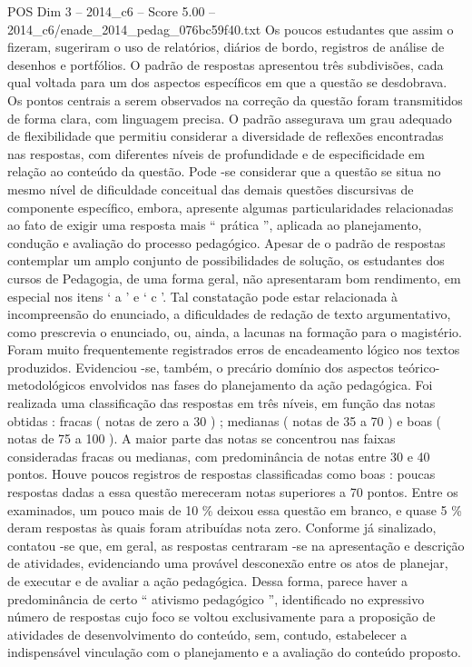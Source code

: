 \begin{textsample}{POS Dim 3 – 2014\_c6 – Score 5.00 – 2014\_c6/enade\_2014\_pedag\_076bc59f40.txt}
Os poucos estudantes que assim o fizeram, sugeriram o uso de relatórios, diários de bordo, registros de análise de desenhos e portfólios.
O padrão de respostas apresentou três subdivisões, cada qual voltada para um dos aspectos específicos em que a questão se desdobrava.
Os pontos centrais a serem observados na correção da questão foram transmitidos de forma clara, com linguagem precisa.
O padrão assegurava um grau adequado de flexibilidade que permitiu considerar a diversidade de reflexões encontradas nas respostas, com diferentes níveis de profundidade e de especificidade em relação ao conteúdo da questão.
Pode -se considerar que a questão se situa no mesmo nível de dificuldade conceitual das demais questões discursivas de componente específico, embora, apresente algumas particularidades relacionadas ao fato de exigir uma resposta mais “ prática ”, aplicada ao planejamento, condução e avaliação do processo pedagógico.
Apesar de o padrão de respostas contemplar um amplo conjunto de possibilidades de solução, os estudantes dos cursos de Pedagogia, de uma forma geral, não apresentaram bom rendimento, em especial nos itens ‘ a ’ e ‘ c ’.
Tal constatação pode estar relacionada à incompreensão do enunciado, a dificuldades de redação de texto argumentativo, como prescrevia o enunciado, ou, ainda, a lacunas na formação para o magistério.
Foram muito frequentemente registrados erros de encadeamento lógico nos textos produzidos.
Evidenciou -se, também, o precário domínio dos aspectos teórico-metodológicos envolvidos nas fases do planejamento da ação pedagógica.
Foi realizada uma classificação das respostas em três níveis, em função das notas obtidas : fracas ( notas de zero a 30 ) ; medianas ( notas de 35 a 70 ) e boas ( notas de 75 a 100 ).
A maior parte das notas se concentrou nas faixas consideradas fracas ou medianas, com predominância de notas entre 30 e 40 pontos.
Houve poucos registros de respostas classificadas como boas : poucas respostas dadas a essa questão mereceram notas superiores a 70 pontos.
Entre os examinados, um pouco mais de 10 \% deixou essa questão em branco, e quase 5 \% deram respostas às quais foram atribuídas nota zero.
Conforme já sinalizado, contatou -se que, em geral, as respostas centraram -se na apresentação e descrição de atividades, evidenciando uma provável desconexão entre os atos de planejar, de executar e de avaliar a ação pedagógica.
Dessa forma, parece haver a predominância de certo “ ativismo pedagógico ”, identificado no expressivo número de respostas cujo foco se voltou exclusivamente para a proposição de atividades de desenvolvimento do conteúdo, sem, contudo, estabelecer a indispensável vinculação com o planejamento e a avaliação do conteúdo proposto.

\end{textsample}
